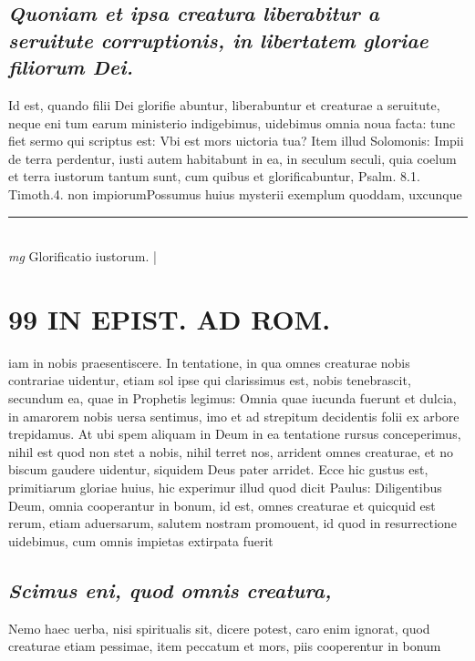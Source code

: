 \documentclass{article}
\begin{document}
\begin{pages}
\subsection*{\textit{Quoniam et ipsa creatura liberabitur a seruitute corruptionis, in libertatem gloriae filiorum Dei. }}\pstart Id est, quando filii Dei glorifie abuntur, liberabuntur et creaturae a seruitute, neque eni tum earum ministerio indigebimus, uidebimus omnia noua facta: tunc fiet sermo qui scriptus est: Vbi est mors uictoria tua? Item illud Solomonis: Impii de terra perdentur, iusti autem habitabunt in ea, in seculum seculi, quia coelum et terra iustorum tantum sunt, cum quibus et glorificabuntur, Psalm. 8.1. Timoth.4. non impiorumPossumus huius mysterii exemplum quoddam, uxcunque   \pend
\vspace{0.5cm}\noindent
\vspace{0.2cm}\rule{1cm}{0.2pt}\\ 
\hspace{0.2cm}\textit{mg}
\footnotesize Glorificatio iustorum.  
\normalsize| 
\section*{99 IN EPIST. AD ROM.  }
\marginpar{[ p.]}\pstart iam in nobis praesentiscere. In tentatione, in qua omnes creaturae nobis contrariae uidentur, etiam sol ipse qui clarissimus est, nobis tenebrascit, secundum ea, quae in Prophetis legimus: Omnia quae iucunda fuerunt et dulcia, in amarorem nobis uersa sentimus, imo et ad strepitum decidentis folii ex arbore trepidamus. At ubi spem aliquam in Deum in ea tentatione rursus conceperimus, nihil est quod non stet a nobis, nihil terret nos, arrident omnes creaturae, et no biscum gaudere uidentur, siquidem Deus pater arridet. Ecce hic gustus est, primitiarum gloriae huius, hic experimur illud quod dicit Paulus: Diligentibus Deum, omnia cooperantur in bonum, id est, omnes creaturae et quicquid est rerum, etiam aduersarum, salutem nostram promouent, id quod in resurrectione uidebimus, cum omnis impietas extirpata fuerit  \pend
{}
{}
\subsection*{\textit{Scimus eni, quod omnis creatura, }}\pstart Nemo haec uerba, nisi spiritualis sit, dicere potest, caro enim ignorat, quod creaturae etiam pessimae, item peccatum et mors, piis cooperentur in bonum\pend
{}
{}

\end{pages}
\end{document}
